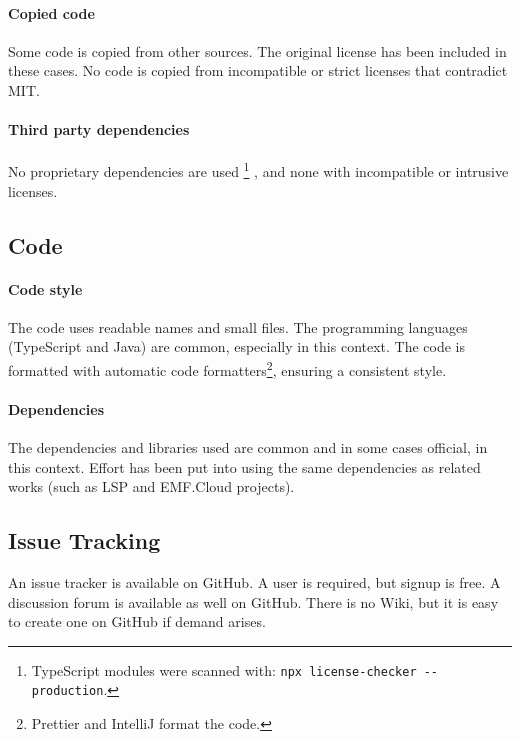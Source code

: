\paragraph{Copied code}
Some code is copied from other sources.
The original license has been included in these cases.
No code is copied from incompatible or strict licenses that contradict MIT.

\paragraph{Third party dependencies}
No proprietary dependencies are used%
\footnote{TypeScript modules were scanned with: \lstinline{npx license-checker --production}.}
, and none with incompatible or intrusive licenses.

\subsection{Code}

\paragraph{Code style}
The code uses readable names and small files.
The programming languages (TypeScript and Java) are common, especially in this context.
The code is formatted with automatic code formatters\footnote{Prettier and IntelliJ format the code.}, ensuring a consistent style.

\paragraph{Dependencies}
The dependencies and libraries used are common and in some cases official, in this context.
Effort has been put into using the same dependencies as related works (such as \acrshort{LSP} and EMF.Cloud projects).


\subsection{Issue Tracking}

An issue tracker is available on \gls{GitHub}.
A user is required, but signup is free.
A discussion forum is available as well on \gls{GitHub}.
There is no Wiki, but it is easy to create one on \gls{GitHub} if demand arises.

